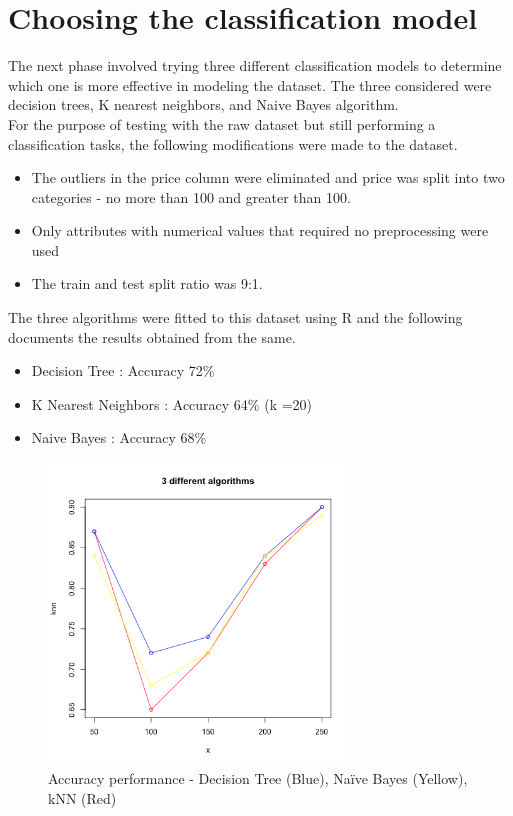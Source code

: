 \documentclass{sig-alternate}
\begin{document}
	\section{Choosing the classification model}
	The next phase involved trying three different classification models to determine which one is more effective in modeling the dataset. The three considered were decision trees, K nearest neighbors, and Naive Bayes algorithm. \\
	For the purpose of testing with the raw dataset but still performing a classification tasks, the following modifications were made to the dataset.\\
	\begin{itemize}
		\item The outliers in the price column were eliminated and price was split into two categories - no more than 100 and greater than 100.
		\item Only attributes with numerical values that required no preprocessing were used
		\item The train and test split ratio was 9:1.
	\end{itemize}
	The three algorithms were fitted to this dataset using R and the following documents the results obtained from the same.
	\begin{itemize}
		\item Decision Tree : Accuracy 72\%
		\item K Nearest Neighbors : Accuracy 64\% (k =20)
		\item Naive Bayes : Accuracy 68\%
	\end{itemize}
	\begin{figure}[ht]
		\includegraphics[width=8cm]{line_diagram.jpg}
		\caption{Accuracy performance - Decision Tree (Blue), Naïve Bayes (Yellow), kNN (Red)}
		\label{linediag}
		\centering
	\end{figure}
	
\end{document}
